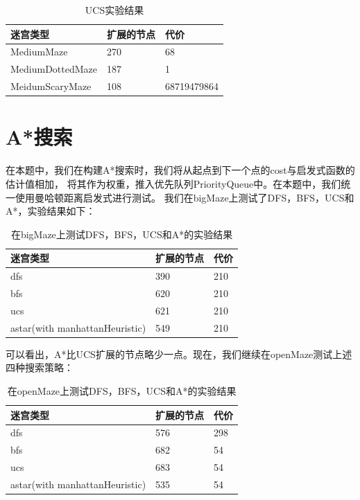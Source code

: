 \documentclass{article}
\begin{document}
\begin{table}[H]
	\centering
	\caption{UCS实验结果}
	\begin{tabular}{lll}
		\hline
	迷宫类型             & 扩展的节点 & 代价          \\
	\hline
	MediumMaze       & 270   & 68          \\
	MediumDottedMaze & 187   & 1           \\
	MeidumScaryMaze  & 108   &  68719479864\\
	\hline
	\end{tabular}
	\end{table}


\section{A*搜索}
在本题中，我们在构建A*搜索时，我们将从起点到下一个点的cost与启发式函数的估计值相加，
将其作为权重，推入优先队列PriorityQueue中。在本题中，我们统一使用曼哈顿距离启发式进行测试。
我们在bigMaze上测试了DFS，BFS，UCS和A*，实验结果如下：

\begin{table}[H]
	\centering
	\caption{在bigMaze上测试DFS，BFS，UCS和A*的实验结果}
	\begin{tabular}{lll}
		\hline
	迷宫类型                           & 扩展的节点 & 代价  \\
	\hline
	dfs                            & 390   & 210 \\
	bfs                            & 620   & 210 \\
	ucs                            & 621   & 210 \\
	astar(with manhattanHeuristic) & 549   & 210\\ \hline
	\end{tabular}
	\end{table}

	可以看出，A*比UCS扩展的节点略少一点。现在，我们继续在openMaze测试上述四种搜索策略：

	\begin{table}[H]
		\centering
		\caption{在openMaze上测试DFS，BFS，UCS和A*的实验结果}
		\begin{tabular}{lll}
			\hline
		迷宫类型                           & 扩展的节点 & 代价  \\ \hline
		dfs                            & 576   & 298 \\
		bfs                            & 682   & 54  \\
		ucs                            & 683   & 54  \\
		astar(with manhattanHeuristic) & 535   & 54 \\ \hline
		\end{tabular}
		\end{table}
\end{document}

